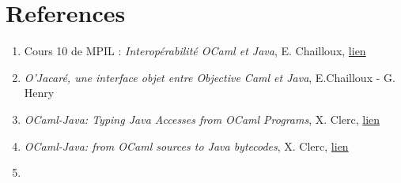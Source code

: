 \documentclass[a4paper, 11pt]{report}
\begin{document}
\newpage

\section*{References}
\begin{enumerate}
\item Cours 10 de MPIL : \emph{Interopérabilité OCaml et Java}, E. Chailloux,
\href{https://www-licence.ufr-info-p6.jussieu.fr/lmd/licence/2013/ue/LI332-2013oct/public/cours/COURS10.pdf}{lien}
\item \emph{O'Jacaré, une interface objet entre Objective Caml et Java}, E.Chailloux - G. Henry
\item\emph{OCaml-Java: Typing Java Accesses from OCaml Programs}, X. Clerc,
\href{http://www.cs.ru.nl/P.Achten/IFL2013/symposium_proceedings_IFL2013/ifl2013_submission_17.pdf}{lien}
\item \emph{OCaml-Java: from OCaml sources to Java bytecodes}, X. Clerc,
\href{http://www.lexifi.com/ml2012/full9.pd}{lien}
\item
\end{enumerate}
\end{document}
